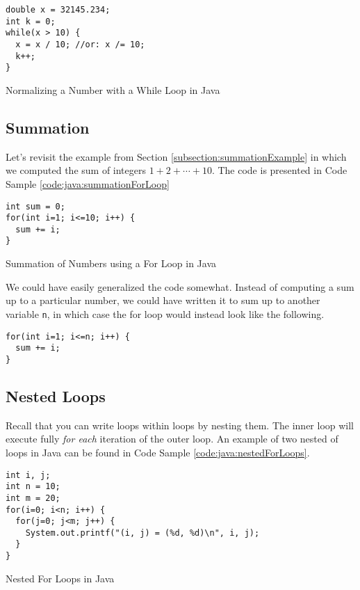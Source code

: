 \begin{listing}[!h]
\begin{verbatim}
double x = 32145.234;
int k = 0;
while(x > 10) {
  x = x / 10; //or: x /= 10;
  k++;
}
\end{verbatim}
  \caption{Normalizing a Number with a While Loop in Java}
  \label{code:java:normalizeWhileLoop}
\end{listing}

\subsection{Summation}

Let's revisit the example from Section \ref{subsection:summationExample} in which
we computed the sum of integers $1 + 2 + \cdots + 10$.  The code is presented in
Code Sample \ref{code:java:summationForLoop}

\begin{listing}[!h]
\begin{verbatim}
int sum = 0;
for(int i=1; i<=10; i++) {
  sum += i;
}
\end{verbatim}
  \caption{Summation of Numbers using a For Loop in Java}
  \label{code:java:summationForLoop}
\end{listing}

We could have easily generalized the code somewhat.  Instead of computing
a sum up to a particular number, we could have written it to sum up to another
variable \texttt{n}, in which case the for loop would instead look like the
following.

\begin{verbatim}
for(int i=1; i<=n; i++) {
  sum += i;
}
\end{verbatim}

\subsection{Nested Loops}

Recall that you can write loops within loops by nesting them.  The inner loop will execute fully 
\emph{for each} iteration of the outer loop.  An example of two nested of
loops in Java can be found in Code Sample \ref{code:java:nestedForLoops}.

\begin{listing}[!h]
\begin{verbatim}
int i, j;
int n = 10;
int m = 20;
for(i=0; i<n; i++) {
  for(j=0; j<m; j++) {
    System.out.printf("(i, j) = (%d, %d)\n", i, j);
  }
}
\end{verbatim}
  \caption{Nested For Loops in Java}
  \label{code:java:nestedForLoops}
\end{listing}

